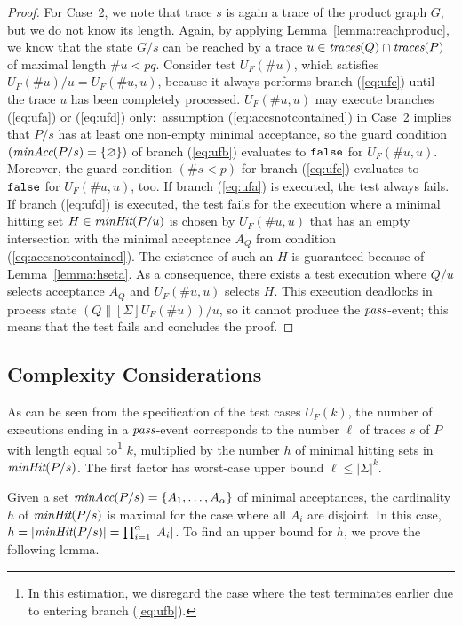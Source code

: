 \begin{proof}
For   Case~2, we note that trace $s$ is again a trace of the product graph
$G$, but we do not know its length. Again, by applying Lemma~\ref{lemma:reachproduc},
we know that the state   $G/s$ can   be reached by a trace
$u\in\text{\it traces}(Q)\cap\text{\it traces}(P)$ of maximal length $\#u < pq$. Consider test $U_F(\#
u)$, which satisfies $U_F(\# u)/u = U_F(\#u,u)$, because it always performs
branch (\ref{eq:ufc}) until the trace $u$ has been completely processed.
$U_F(\#u,u)$ may execute branches (\ref{eq:ufa}) or (\ref{eq:ufd})
only:~assumption (\ref{eq:accsnotcontained}) in Case~2 implies that $P/s$ has
at least one non-empty minimal acceptance, so the guard condition 
$(\text{\it minAcc}(P/s) = \{ \varnothing \})$ 
of branch (\ref{eq:ufb}) evaluates to $\mbox{{\tt false}}$ for $U_F(\#u,u)$.
Moreover, the guard condition $(\#s < p)$ for branch (\ref{eq:ufc}) evaluates
to $\mbox{{\tt false}}$ for $U_F(\#u,u)$, too. If branch (\ref{eq:ufa}) is executed, the
test always fails. If branch (\ref{eq:ufd}) is executed, the test fails for
the execution where a minimal hitting set $H\in\text{\it minHit}(P/u)$ is chosen
by $U_F(\#u,u)$ that has an empty intersection with the minimal acceptance
$A_Q$ from condition (\ref{eq:accsnotcontained}). The existence of such an
$H$ is guaranteed because of Lemma~\ref{lemma:hseta}. As a consequence, there
exists a test execution   where $Q/u$ selects acceptance $A_Q$ and
$U_F(\#u,u)$ selects $H$. This execution deadlocks in process state
$(Q\parallel[\Sigma]U_F(\# u))/u$, so it cannot produce the ${\text{\it pass}}$-event; 
this  means that the test fails and concludes the proof. \xbox
\end{proof}



\subsection{Complexity Considerations}
\label{sec:complexity}

As can be seen from the specification of the test cases $U_F(k)$, the number of 
executions ending in a ${\text{\it pass}}$-event corresponds to the number $\ell$ of traces $s$ 
of $P$ with length equal to\footnote{In this estimation, we disregard 
the case where the test
terminates earlier due to entering branch (\ref{eq:ufb}).} $k$, 
multiplied by the number $h$ of minimal hitting sets in
$\text{\it minHit}(P/s)$. The first factor 
has worst-case upper bound $\ell\le |\Sigma|^k$.



Given a set $\text{\it minAcc}(P/s) = \{ A_1,\dots, A_\alpha \}$ of   minimal acceptances,
the cardinality $h$ of $\text{\it minHit}(P/s)$ is maximal for the case where all $A_i$ are disjoint. In this case,  $h=|\text{\it minHit}(P/s)| = \prod_{i=1}^\alpha|A_i|$. 
To find an upper bound for $h$, we prove the following lemma.


